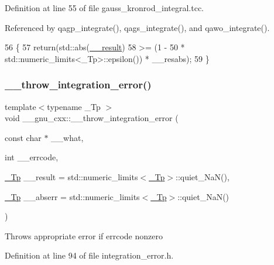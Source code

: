 Definition at line 55 of file gauss\+\_\+kronrod\+\_\+integral.\+tcc.



Referenced by qagp\+\_\+integrate(), qags\+\_\+integrate(), and qawo\+\_\+integrate().


\begin{DoxyCode}
56     \{
57       \textcolor{keywordflow}{return}(std::abs(\hyperlink{namespace____gnu__cxx_a500ea9f53aeaecd8c2ae657503450578}{\_\_result})
58           >= (1 - 50 * std::numeric\_limits<\_Tp>::epsilon()) * \_\_resabs);
59     \}
\end{DoxyCode}
\mbox{\label{namespace____gnu__cxx_a2ae22137ca092b8ae10f4d42b4e32cfb}} 
\subsubsection{\texorpdfstring{\+\_\+\+\_\+throw\+\_\+integration\+\_\+error()}{\_\_throw\_integration\_error()}}
{\footnotesize\ttfamily template$<$typename \+\_\+\+Tp $>$ \\
void \+\_\+\+\_\+gnu\+\_\+cxx\+::\+\_\+\+\_\+throw\+\_\+integration\+\_\+error (\begin{DoxyParamCaption}\item[{const char $\ast$}]{\+\_\+\+\_\+what,  }\item[{int}]{\+\_\+\+\_\+errcode,  }\item[{\hyperlink{namespace____gnu__cxx_a3b19a9c800ca194374ef9172290f7d79}{\+\_\+\+Tp}}]{\+\_\+\+\_\+result = {\ttfamily std\+:\+:numeric\+\_\+limits$<$\hyperlink{namespace____gnu__cxx_a3b19a9c800ca194374ef9172290f7d79}{\+\_\+\+Tp}$>$\+:\+:quiet\+\_\+NaN()},  }\item[{\hyperlink{namespace____gnu__cxx_a3b19a9c800ca194374ef9172290f7d79}{\+\_\+\+Tp}}]{\+\_\+\+\_\+abserr = {\ttfamily std\+:\+:numeric\+\_\+limits$<$\hyperlink{namespace____gnu__cxx_a3b19a9c800ca194374ef9172290f7d79}{\+\_\+\+Tp}$>$\+:\+:quiet\+\_\+NaN()} }\end{DoxyParamCaption})}

Throws appropriate error if errcode nonzero 

Definition at line 94 of file integration\+\_\+error.\+h.



